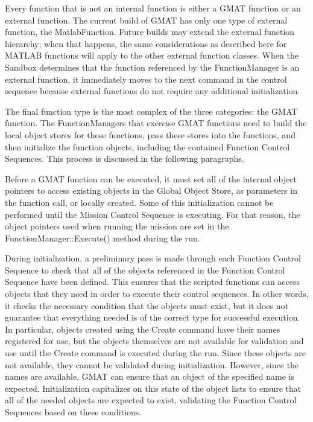 Every function that is not an internal function is either a GMAT function or an external function.
 The current build of GMAT has only one type of external function, the MatlabFunction.  Future
builds may extend the external function hierarchy; when that happens, the same considerations as
described here for MATLAB functions will apply to the other external function classes.  When the
Sandbox determines that the function referenced by the FunctionManager is an external function, it
immediately moves to the next command in the control sequence because external functions do not
require any additional initialization.

The final function type is the most complex of the three categories: the GMAT function.  The
FunctionManagers that exercise GMAT functions need to build the local object stores for these
functions, pass these stores into the functions, and then initialize the function objects, including
the contained Function Control Sequences.  This process is discussed in the following paragraphs.

Before a GMAT function can be executed, it must set all of the internal object pointers to access
existing objects in the Global Object Store, as parameters in the function call, or locally
created.  Some of this initialization cannot be performed until the Mission Control Sequence is
executing.  For that reason, the object pointers used when running the mission are set in the
FunctionManager::Execute() method during the run.

During initialization, a preliminary pass is made through each Function Control Sequence to check
that all of the objects referenced in the Function Control Sequence have been defined.  This ensures
that the scripted functions can access objects that they need in order to execute their control
sequences.  In other words, it checks the necessary condition that the objects must exist, but it
does not guarantee that everything needed is of the correct type for successful execution.  In
particular, objects created using the Create command have their names registered for use, but the
objects themselves are not available for validation and use until the Create command is executed
during the run.  Since these objects are not available, they cannot be validated during
initialization.  However, since the names are available, GMAT can ensure that an object of the
specified name is expected.  Initialization capitalizes on this state of the object lists to ensure
that all of the needed objects are expected to exist, validating the Function Control Sequences
based on these conditions.

